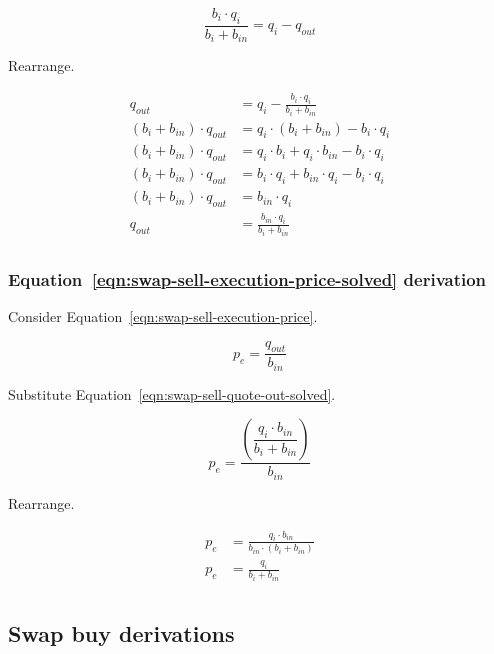 \documentclass[table, twocolumn]{article}
\begin{document}
\begin{equation}
	\frac{b_i \cdot q_i}{b_i + b_{in}}= q_i - q_{out} \nonumber
\end{equation}

Rearrange.

\begin{align}
	q_{out} & = q_i - \frac{b_i \cdot q_i}{b_i + b_{in}} \nonumber       \\
	(b_i + b_{in}) \cdot q_{out} &= q_i \cdot (b_i + b_{in}) - b_i \cdot q_i \nonumber \\
	(b_i + b_{in}) \cdot q_{out} &=
  q_i \cdot b_i + q_i \cdot b_{in} - b_i \cdot q_i \nonumber \\
	(b_i + b_{in}) \cdot q_{out} &=
  b_i \cdot q_i + b_{in} \cdot q_i - b_i \cdot q_i \nonumber \\
	(b_i + b_{in}) \cdot q_{out} &= b_{in} \cdot q_i \nonumber \\
	q_{out} & = \frac{b_{in} \cdot q_i}{b_i + b_{in}} \nonumber \\
\end{align}

\subsubsection{Equation~\ref{eqn:swap-sell-execution-price-solved} derivation}%
\label{sssec:equation-eqn-swap-sell-execution-price-solved-derivation}

Consider Equation~\ref{eqn:swap-sell-execution-price}.

\begin{equation}
	p_e = \frac{q_{out}}{b_{in}} \nonumber
\end{equation}

Substitute Equation~\ref{eqn:swap-sell-quote-out-solved}.

\begin{equation}
	p_e = \dfrac{\left(\dfrac{q_i \cdot b_{in}}{b_i + b_{in}}\right)}{b_{in}} \nonumber
\end{equation}

Rearrange.

\begin{align}
	p_e &= \frac{q_i \cdot b_{in}}{b_{in} \cdot (b_i + b_{in})} \nonumber \\
	p_e &= \frac{q_i}{b_i + b_{in}} \nonumber \\
\end{align}

\subsection{Swap buy derivations}\label{ssec:swap-buy-derivations}
\end{document}
